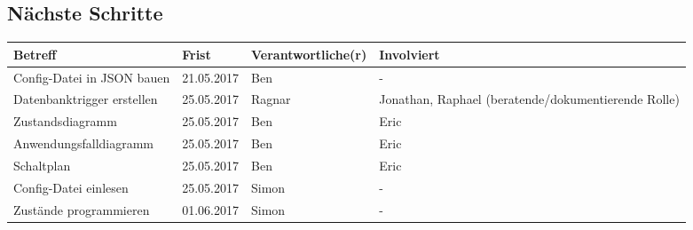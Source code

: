 \documentclass{scrartcl}
\begin{document}
\subsection{Nächste Schritte}
\begin{tabular}{L{.249} L{.2} L{.25} L{.25}}
Betreff & Frist & Verantwortliche(r) & Involviert\\ \hline

Config-Datei in JSON bauen & 21.05.2017 & Ben & - \\ \hline
Datenbanktrigger erstellen & 25.05.2017 & Ragnar & Jonathan, Raphael (beratende/dokumentierende Rolle) \\ \hline
Zustandsdiagramm & 25.05.2017 & Ben  & Eric \\ \hline
Anwendungsfalldiagramm & 25.05.2017 & Ben  & Eric \\ \hline
Schaltplan & 25.05.2017 & Ben  & Eric \\ \hline
Config-Datei einlesen & 25.05.2017 & Simon & - \\ \hline
Zustände programmieren & 01.06.2017 & Simon & - \\ \hline



\end{tabular}
\end{document}
